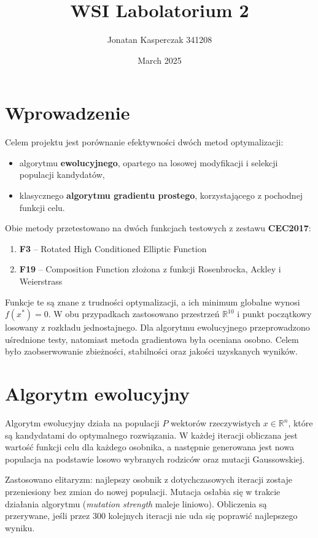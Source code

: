 \documentclass[a4paper]{article}
\title{WSI Labolatorium 2}
\author{Jonatan Kasperczak 341208}
\date{March 2025}
\begin{document}
\maketitle
\section{Wprowadzenie}
Celem projektu jest porównanie efektywności dwóch metod optymalizacji:
\begin{itemize}
  \item algorytmu \textbf{ewolucyjnego}, opartego na losowej modyfikacji i selekcji populacji kandydatów,
  \item klasycznego \textbf{algorytmu gradientu prostego}, korzystającego z pochodnej funkcji celu.
\end{itemize}

Obie metody przetestowano na dwóch funkcjach testowych z zestawu \textbf{CEC2017}:
\begin{enumerate}
  \item \textbf{F3} – Rotated High Conditioned Elliptic Function
  \item \textbf{F19} – Composition Function złożona z funkcji Rosenbrocka, Ackley i Weierstrass
\end{enumerate}

Funkcje te są znane z trudności optymalizacji, a ich minimum globalne wynosi $f(x^*) = 0$.  
W obu przypadkach zastosowano przestrzeń \(\mathbb{R}^{10}\) i punkt początkowy losowany z rozkładu jednostajnego.  
Dla algorytmu ewolucyjnego przeprowadzono uśrednione testy, natomiast metoda gradientowa była oceniana osobno.  
Celem było zaobserwowanie zbieżności, stabilności oraz jakości uzyskanych wyników.

\section{Algorytm ewolucyjny}

Algorytm ewolucyjny działa na populacji $P$ wektorów rzeczywistych $x \in \mathbb{R}^n$, które są kandydatami do optymalnego rozwiązania.  
W każdej iteracji obliczana jest wartość funkcji celu dla każdego osobnika, a następnie generowana jest nowa populacja na podstawie losowo wybranych rodziców oraz mutacji Gaussowskiej.

Zastosowano elitaryzm: najlepszy osobnik z dotychczasowych iteracji zostaje przeniesiony bez zmian do nowej populacji.  
Mutacja osłabia się w trakcie działania algorytmu (\emph{mutation strength} maleje liniowo).  
Obliczenia są przerywane, jeśli przez 300 kolejnych iteracji nie uda się poprawić najlepszego wyniku.
\end{document}

